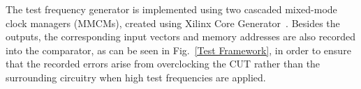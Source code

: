 \documentclass[journal]{IEEEtran}
\begin{document}
The test frequency generator is implemented using two cascaded mixed-mode clock managers (MMCMs), created using Xilinx Core Generator~\cite{Virtex6Clocking}. Besides the outputs, the corresponding input vectors and memory addresses are also recorded into the comparator, as can be seen in Fig.~\ref{Test Framework}, in order to ensure that the recorded errors arise from overclocking the CUT rather than the surrounding circuitry when high test frequencies are applied.




\end{document}
